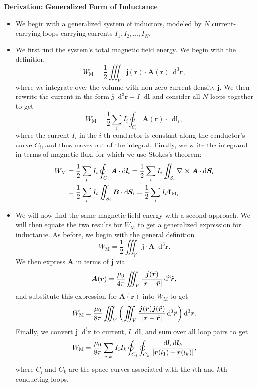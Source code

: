 \documentclass[11pt, a4paper]{article}
\newcommand{\diff}{\mathop{}\!\mathrm{d}} %
\newcommand{\dr}{\diff^{3} \r}  %
\newcommand{\dtr}{\diff^{3} \tilde{\r}}  %
\renewcommand{\vec}[1]{\bm{#1}} %
\renewcommand{\t}[1]{\tilde{#1}} %
\renewcommand{\r}{\vec{r}}
\newcommand{\B}{\vec{B}} %
\newcommand{\A}{\vec{A}} %
\newcommand{\mm}{\mu_{0}}  %
\renewcommand{\j}{\vec{j}}  %
\renewcommand{\curl}{\nabla \cross}
\begin{document}
\textbf{Derivation: Generalized Form of Inductance}
\begin{itemize}

	\item We begin with a generalized system of inductors, modeled by $ N $ current-carrying loops carrying currents $ I_{1}, I_{2}, \ldots, I_{N} $.
	
	\item We first find the system's total magnetic field energy. We begin with the definition
	\begin{equation*}
        W_{\text{M}} = \frac{1}{2}\iiint_{V}\j(\r) \cdot \A(\r) \dr,
	\end{equation*}
	where we integrate over the volume with non-zero current density $ \j $. We then rewrite the current in the form $ \j \dr = I \diff \vec{l} $ and consider all $ N $ loops together to get
	\begin{equation*}
        W_{\text{M}} = \frac{1}{2}\sum_{i}I_{i}\oint_{C_{i}} \A(\r) \cdot \diff \vec{l}_{i},
	\end{equation*}
	where the current $ I_{i} $ in the $ i $-th conductor is constant along the conductor's curve $ C_{i} $, and thus moves out of the integral. Finally, we write the integrand in terms of magnetic flux, for which we use Stokes's theorem:
	\begin{align*}
        W_{\text{M}} &= \frac{1}{2}\sum_{i}I_{i}\oint_{C_{i}} \A \cdot \diff \vec{l}_{i} = \frac{1}{2}\sum_{i}I_{i}\iint_{S_{i}} \curl \A \cdot \diff \vec{S}_{i} \\
        &= \frac{1}{2}\sum_{i}I_{i}\iint_{S_{i}} \B \cdot \diff \vec{S}_{i} = \frac{1}{2}\sum_{i}I_{i} \Phi_{\text{M}_{i}}.
	\end{align*}
	
	\item We will now find the same magnetic field energy with a second approach. We will then equate the two results for $ W_{\text{M}} $ to get a generalized expression for inductance. As before, we begin with the general definition
	\begin{equation*}
		W_{\text{M}} = \frac{1}{2}\iiint_{V} \j \cdot \A \dr.
	\end{equation*}
	We then express $ \A $ in terms of $ \j $ via
	\begin{equation*}
		\A(\r) = \frac{\mm}{4\pi}\iiint_{V}\frac{\j(\t{\r})}{\abs{\r - \t{\r}}}\dtr,
	\end{equation*}
    and substitute this expression for $ \A(\r) $ into $ W_{\text{M}} $ to get
	\begin{equation*}
		W_{\text{M}} = \frac{\mm}{8\pi}\iiint_{V} \left(\iiint_{V}\frac{\j(\r)\j(\t{\r})}{\abs{\r - \t{\r}}}\dtr\right)\dr.
	\end{equation*}
	Finally, we convert $ \j \dr $ to current, $ I \diff \vec{l} $, and sum over all loop pairs to get
	\begin{equation*}
		W_{\text{M}} = \frac{\mm}{8\pi}\sum_{i, k}I_{i}I_{k}\oint_{C_{i}}\oint_{C_{k}}\frac{\diff \vec{l}_{i}\diff \vec{l}_{k}}{\abs{\r(l_{1}) - \r(l_{k})}},
	\end{equation*}
	where $ C_{i} $ and $ C_{k} $ are the space curves associated with the $ i $th and $ k $th conducting loops.
	

\end{itemize}
\end{document}
